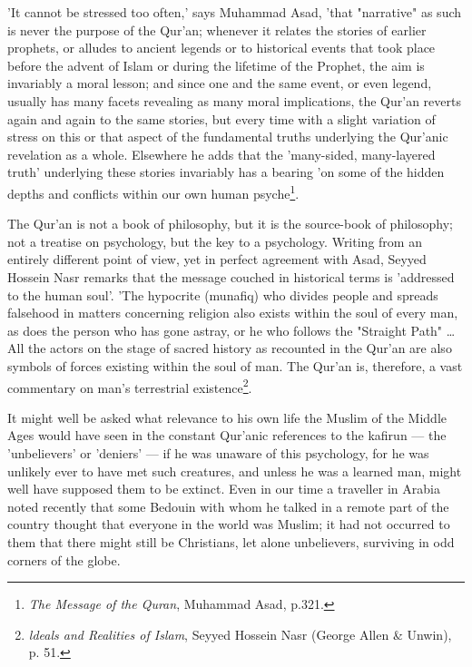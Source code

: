 \documentclass[11pt, b5paper, twoside]{book}
\begin{document}
'It cannot be stressed too often,' says Muhammad Asad, 'that "narrative" as such is never the purpose 
of the Qur'an; whenever it relates the stories of earlier prophets, or alludes to ancient legends or 
to historical events that took place before the advent of Islam or during the lifetime of the 
Prophet, the aim is invariably a moral lesson; and since one and the same event, or even legend, 
usually has many facets revealing as many moral implications, the Qur'an reverts again and again to 
the same stories, but every time with a slight variation of stress on this or that aspect of the 
fundamental truths underlying the Qur'anic revelation as a whole. Elsewhere he adds that the 
'many-sided, many-layered truth' underlying these stories invariably has a bearing 'on some of the 
hidden depths and conflicts within our own human psyche\footnote{\emph{The Message of the Quran}, Muhammad Asad, p.321.}.

The Qur'an is not a book of philosophy, but it is the source-book of philosophy; not a treatise on 
psychology, but the key to a psychology. Writing from an entirely different point of view, yet in 
perfect agreement with Asad, Seyyed Hossein Nasr remarks that the message couched in historical terms 
is 'addressed to the human soul'. 'The hypocrite (munafiq) who divides people and spreads falsehood 
in matters concerning religion also exists within the soul of every man, as does the person who has 
gone astray, or he who follows the "Straight Path" \ldots{} All the actors on the stage of sacred history 
as recounted in the Qur'an are also symbols of forces existing within the soul of man. The Qur'an is, 
therefore, a vast commentary on man's terrestrial existence\footnote{\emph{ldeals and Realities of Islam}, Seyyed Hossein Nasr (George Allen \& Unwin), p. 51.}.

It might well be asked what relevance to his own life the Muslim of the Middle Ages would have seen 
in the constant Qur'anic references to the kafirun --- the 'unbelievers' or 'deniers' --- if he was 
unaware of this psychology, for he was unlikely ever to have met such creatures, and unless he was a 
learned man, might well have supposed them to be extinct. Even in our time a traveller in Arabia 
noted recently that some Bedouin with whom he talked in a remote part of the country thought that 
everyone in the world was Muslim; it had not occurred to them that there might still be Christians, 
let alone unbelievers, surviving in odd corners of the globe. \\
\end{document}
